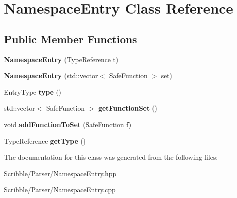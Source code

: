 \hypertarget{class_namespace_entry}{\section{Namespace\-Entry Class Reference}
\label{class_namespace_entry}
}
\subsection*{Public Member Functions}
\begin{DoxyCompactItemize}
\item 
\hypertarget{class_namespace_entry_a3fbc187d6b6da8f3276f33df907c76db}{{\bfseries Namespace\-Entry} (Type\-Reference t)}\label{class_namespace_entry_a3fbc187d6b6da8f3276f33df907c76db}

\item 
\hypertarget{class_namespace_entry_ad4819b60d929b0eb7ca1ee2415aba078}{{\bfseries Namespace\-Entry} (std\-::vector$<$ Safe\-Function $>$ set)}\label{class_namespace_entry_ad4819b60d929b0eb7ca1ee2415aba078}

\item 
\hypertarget{class_namespace_entry_a61783676ac1b8c029a72c64162315bbf}{Entry\-Type {\bfseries type} ()}\label{class_namespace_entry_a61783676ac1b8c029a72c64162315bbf}

\item 
\hypertarget{class_namespace_entry_af3d40b8f2aaaa46b6dfaa6550cf5bd34}{std\-::vector$<$ Safe\-Function $>$ {\bfseries get\-Function\-Set} ()}\label{class_namespace_entry_af3d40b8f2aaaa46b6dfaa6550cf5bd34}

\item 
\hypertarget{class_namespace_entry_a926723cea6524c1fe35c08248aefaaec}{void {\bfseries add\-Function\-To\-Set} (Safe\-Function f)}\label{class_namespace_entry_a926723cea6524c1fe35c08248aefaaec}

\item 
\hypertarget{class_namespace_entry_a35273930b70896a24107a4c9e7618ece}{Type\-Reference {\bfseries get\-Type} ()}\label{class_namespace_entry_a35273930b70896a24107a4c9e7618ece}

\end{DoxyCompactItemize}


The documentation for this class was generated from the following files\-:\begin{DoxyCompactItemize}
\item 
Scribble/\-Parser/Namespace\-Entry.\-hpp\item 
Scribble/\-Parser/Namespace\-Entry.\-cpp\end{DoxyCompactItemize}
